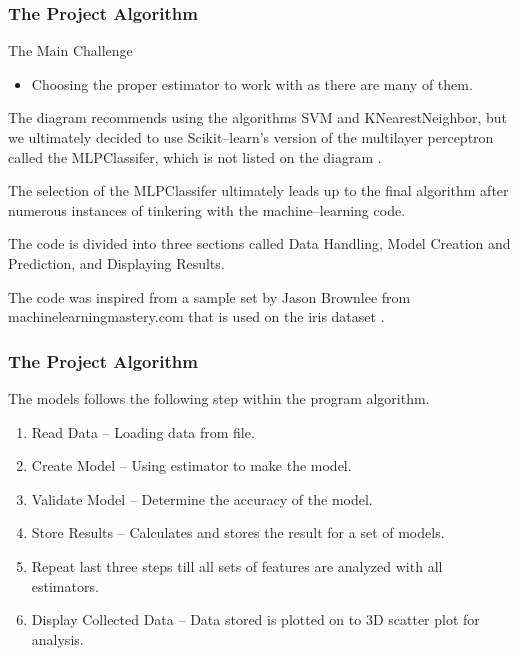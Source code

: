 \documentclass{beamer}
\begin{document}
\begin{frame}
\frametitle{The Project Algorithm}
\footnotesize

The Main Challenge
\begin{itemize}
\item Choosing the proper estimator to work with as there are many of them.
\end{itemize}


The diagram recommends using the algorithms SVM and KNearestNeighbor, but we ultimately decided to use Scikit--learn's version of the multilayer perceptron called the MLPClassifer, which is not listed on the diagram \cite{SciKit}.
\newline

The selection of the MLPClassifer ultimately leads up to the final algorithm after numerous instances of tinkering with the machine--learning code.
\newline

The code is divided into three sections called Data Handling, Model Creation and Prediction, and Displaying Results.
\newline

The code was inspired from a sample set by Jason Brownlee from machinelearningmastery.com that is used on the iris dataset \cite{MLMaster}.
\end{frame}

\begin{frame}
\frametitle{The Project Algorithm}

The models follows the following step within the program algorithm.
\begin{enumerate}
\item Read Data -- Loading data from file.
\item Create Model -- Using estimator to make the model.
\item Validate Model -- Determine the accuracy of the model.
\item Store Results -- Calculates and stores the result for a set of models.
\item Repeat last three steps till all sets of features are analyzed with all estimators.
\item Display Collected Data -- Data stored is plotted on to 3D scatter plot for analysis. 
\end{enumerate}
\end{frame}
\end{document}
